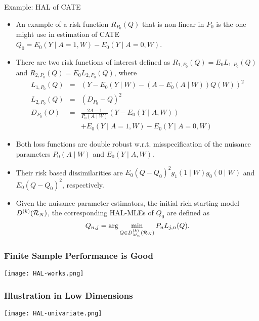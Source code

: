 \documentclass[t]{beamer}
\newlength{\wideitemsep}
\let\olditem\item
\renewcommand{\item}{\setlength{\itemsep}{\wideitemsep}\olditem}
\begin{document}
\begin{frame}{Example: HAL of CATE}
\begin{itemize}
\item An example of a risk function $R_{P_0}(Q)$ that is non-linear in $P_0$ is the one might use in estimation of CATE $Q_0=E_0(Y\mid A=1,W)-E_0(Y\mid A=0,W)$.
\item There are two risk functions of interest defined as $R_{1,P_0}(Q)=E_0L_{1,P_0}(Q)$ and $R_{2,P_0}(Q)=E_0L_{2,P_0}(Q)$, where
\begin{eqnarray*}
L_{1,P_0}(Q)&=& (Y-E_0(Y\mid W)-(A-E_0(A\mid W))Q(W))^2\\
L_{2,P_0}(Q)&=& (D_{P_0}-Q)^2\\
D_{P_0}(O)&=& \frac{2A-1}{P_0(A\mid W)}(Y-E_0(Y\mid A,W))\\
&&+E_0(Y\mid A=1,W)-E_0(Y\mid A=0,W)
\end{eqnarray*}
\item Both loss functions are double robust w.r.t. misspecification of the nuisance parameters $P_0(A\mid W)$ and $E_0(Y\mid A,W)$.
\end{itemize}
\end{frame}
\begin{frame}
\begin{itemize}
\item Their risk based dissimilarities are $E_0(Q-Q_0)^2g_1(1\mid W)g_0(0\mid W)$ and $E_0(Q-Q_0)^2$, respectively.
\item Given the nuisance parameter estimators,  the initial rich starting model $D^{(k)}({\cal R}_N)$, the corresponding HAL-MLEs of $Q_0$  are defined as
\[
Q_{n,j}=\arg\min_{Q\in D^{(k)}_{M_n}({\cal R}_N)}P_n L_{j,n}(Q).\]
\end{itemize}
\end{frame}

\begin{frame}
\frametitle{Finite Sample Performance is Good}
\vspace{-5pt}
\begin{center}
\texttt{[image: HAL-works.png]}
\end{center}
\end{frame}

\begin{frame}
\frametitle{Illustration in Low Dimensions}
\vspace{-5pt}
\begin{center}
\texttt{[image: HAL-univariate.png]}
\end{center}
\end{frame}
\end{document}
